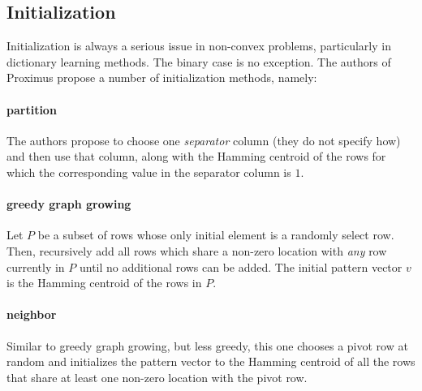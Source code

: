 \documentclass[a4paper]{IEEEtran}
\begin{document}
\subsection{Initialization}

Initialization is always a serious issue in non-convex problems, particularly in dictionary learning methods. The binary case is no exception. The authors of Proximus propose a number of initialization methods, namely: 

\paragraph{partition} The authors propose to choose one \emph{separator} column (they do not specify how) and then use that column, along with the Hamming centroid of the rows for which the corresponding value in the separator column is $1$.
\paragraph{greedy graph growing} Let $P$ be a subset of rows whose only initial element is a randomly select row. Then, recursively add all rows which share a non-zero location with \emph{any} row currently in $P$ until no additional rows can be added. The initial pattern vector $v$ is the Hamming centroid of the rows in $P$.
\paragraph{neighbor} Similar to greedy graph growing, but less greedy, this one chooses a pivot row at random and initializes the pattern vector to the Hamming centroid of all the rows that share at least one non-zero location with the pivot row.
\end{document}
